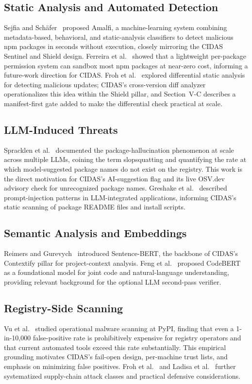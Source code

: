 \documentclass[journal]{IEEEtran}
\begin{document}
\subsection{Static Analysis and Automated Detection}
Sejfia and Sch\"{a}fer~\cite{sejfia2022} proposed Amalfi, a machine-learning system combining metadata-based,
behavioral, and static-analysis classifiers to detect malicious npm packages in seconds without execution,
closely mirroring the CIDAS Sentinel and Shield design. Ferreira et al.~\cite{ferreira2021} showed that a
lightweight per-package permission system can sandbox most npm packages at near-zero cost, informing a
future-work direction for CIDAS. Froh et al.~\cite{froh2023} explored differential static analysis for
detecting malicious updates; CIDAS's cross-version diff analyzer operationalizes this idea within the Shield
pillar, and Section~V-C describes a manifest-first gate added to make the differential check practical at
scale.

\subsection{LLM-Induced Threats}
Spracklen et al.~\cite{spracklen2025} documented the package-hallucination phenomenon at scale across
multiple LLMs, coining the term slopsquatting and quantifying the rate at which model-suggested package
names do not exist on the registry. This work is the direct motivation for CIDAS's AI-suggestion flag and its
live OSV.dev advisory check for unrecognized package names. Greshake et al.~\cite{greshake2023} described
prompt-injection patterns in LLM-integrated applications, informing CIDAS's static scanning of package
README files and install scripts.

\subsection{Semantic Analysis and Embeddings}
Reimers and Gurevych~\cite{reimers2019} introduced Sentence-BERT, the backbone of CIDAS's Contextify pillar
for project-context analysis. Feng et al.~\cite{feng2020} proposed CodeBERT as a foundational model for joint
code and natural-language understanding, providing relevant background for the optional LLM second-pass
verifier.

\subsection{Registry-Side Scanning}
Vu et al.~\cite{vu2023} studied operational malware scanning at PyPI, finding that even a 1-in-10,000
false-positive rate is prohibitively expensive for registry operators and that current automated tools exceed
this rate substantially. This empirical grounding motivates CIDAS's fail-open design, per-machine trust
lists, and emphasis on minimizing false positives. Froh et al.~\cite{froh2023} and Ladisa et
al.~\cite{ladisa2023} further systematized supply-chain attack classes and practical defensive
considerations.
\end{document}
